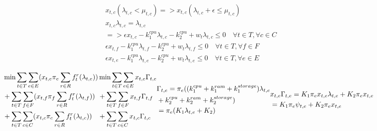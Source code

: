 \documentclass[conference]{IEEEtran}
\begin{document}
    \begin{subequations}
      \begin{align}
        &x_{t,c}(\lambda_{t,c} < \mu_{t,c}) => x_{t,c}(\lambda_{t,c} + \epsilon \le \mu_{t,c}) \\
        &x_{t,c}\lambda_{t,c} = \lambda_{t,c} \\
        &=> \epsilon x_{t,c} - k_1^{cpu}\lambda_{t,c} - k_2^{cpu} + w_t\lambda_{t,c} \le 0 \quad \forall{t \in T}, \forall{c \in C} \\
        &\epsilon x_{t,f} - k_1^{cpu}\lambda_{t,f} - k_2^{cpu} + w_t\lambda_{t,f} \le 0 \quad \forall{t \in T}, \forall{f \in F} \\
        &\epsilon x_{t,e} - k_1^{cpu}\lambda_{t,e} - k_2^{cpu} + w_t\lambda_{t,e} \le 0 \quad \forall{t \in T}, \forall{e \in E}
      \end{align}
    \end{subequations}

    \begin{subequations}
      \begin{align}
        & \notag \min \sum_{t \in T}\sum_{e \in E} (x_{t,e}\pi_e\sum_{r \in R}f_t^r(\lambda_{t,e})) \\
        &\notag + \sum_{t \in T}\sum_{f \in F} (x_{t,f}\pi_f\sum_{r \in R}f_t^r(\lambda_{t,f})) \\
        & + \sum_{t \in T}\sum_{c \in C} (x_{t,c}\pi_c\sum_{r \in R}f_t^r(\lambda_{t,c}))
      \end{align}
      \begin{align}
        & \notag \min \sum_{t \in T}\sum_{e \in E} x_{t,e}\Gamma_{t,e} \\
        & \notag + \sum_{t \in T}\sum_{f \in F} x_{t,f}\Gamma_{t,f} \\
        & + \sum_{t \in T}\sum_{c \in C} x_{t,c}\Gamma_{t,c}
      \end{align}
      \begin{align}
        &\notag \Gamma_{t,e} = \pi_e((k_1^{cpu}+k_1^{ram}+k_1^{storage})\lambda_{t,e} \\
        &\notag +k_2^{cpu}+k_2^{ram}+k_2^{storage}) \\
        & = \pi_e(K_1\lambda_{t,e}+K_2)
      \end{align}
      \begin{align}
        &\notag x_{t,e}\Gamma_{t,e} = K_1\pi_ex_{t,e}\lambda_{t,e} + K_2\pi_ex_{t,e} \\
        &= K_1\pi_e\psi_{t,e} + K_2\pi_ex_{t,e}
      \end{align}
    \end{subequations}
\end{document}
